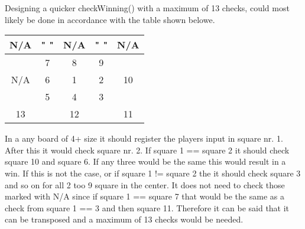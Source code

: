 \documentclass[a4paper,10pt]{article}
\begin{document}
Designing a quicker checkWinning() with a maximum of 13 checks, could most likely be done in accordance with the table shown belowe.   

\centering
\begin{tabular}{|c|c|c|c|c|}
	\hline 
	N/A &"    "& N/A &"    "& N/A \\ 
	\hline 
	& 7 & 8 & 9 &   \\ 
	\hline 
	N/A & 6 & 1 & 2 & 10 \\ 
	\hline 
	& 5 & 4 & 3 &  \\ 
	\hline 
	13 &    & 12 &    & 11 \\ 
	\hline 
\end{tabular} 


\flushleft

In a any board of 4+ size it should register the players input in square nr. 1. After this it would check square nr. 2. If square 1 == square 2 it should check square 10 and square 6. If any three would be the same this would result in a win. If this is not the case, or if square 1 != square 2 the it should check square 3 and so on for all 2 too 9 square in the center. It does not need to check those marked with N/A since if  square 1 == square 7 that would be the same as a check from square 1 == 3 and then square 11. Therefore it can be said that it can be transposed and a maximum of 13 checks would be needed.  
	
	
	\begin{comment}
	Hvis Fern Time er lavet tilføjes det her og begin og end comment skal fjernes. 
	\textbf{Fern program}
	
	
	\end{comment}
	
\end{document}
